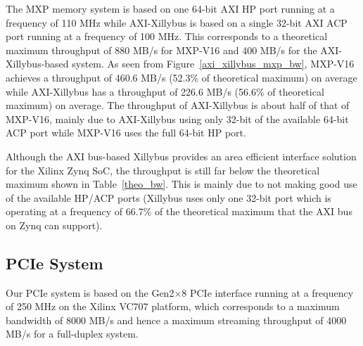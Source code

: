 The MXP memory system is based on one 64-bit AXI HP port running at a frequency of 110 MHz while AXI-Xillybus is based on a single 32-bit AXI ACP port running at a frequency of 100 MHz. 
This corresponds to a theoretical maximum throughput of 880 MB/s for MXP-V16 and 400 MB/s for the AXI-Xillybus-based system. 
As seen from Figure~\ref{axi_xillybus_mxp_bw}, MXP-V16 achieves a throughput of 460.6 MB/s (52.3\% of theoretical maximum) on average while AXI-Xillybus has a throughput of 226.6 MB/s (56.6\% of theoretical maximum) on average. 
The throughput of AXI-Xillybus is about half of that of MXP-V16, mainly due to AXI-Xillybus using only 32-bit of the available 64-bit ACP port while MXP-V16 uses the full 64-bit HP port. 


\begin{table}[tb]
	\caption{Area overhead of AXI bus-based systems.}
	\label{xillybus_mxp_area}
	\centering
\end{table}

Although the AXI bus-based Xillybus provides an area efficient interface solution for the Xilinx Zynq SoC, the throughput is still far below the theoretical maximum shown in Table~\ref{theo_bw}. 
This is mainly due to not making good use of the available HP/ACP ports (Xillybus uses only one 32-bit port which is operating at a frequency of 66.7\% of the theoretical maximum that the AXI bus on Zynq can support). 


\subsection{PCIe System}
Our PCIe system is based on the Gen2$\times$8 PCIe interface running at a frequency of 250 MHz on the Xilinx VC707 platform, which corresponds to a maximum bandwidth of 8000 MB/s and hence a maximum streaming throughput of 4000 MB/s for a full-duplex system. 


